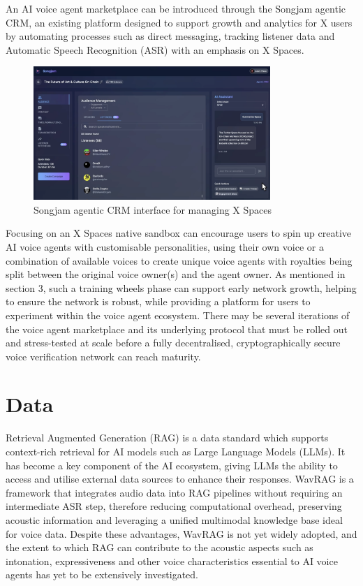 \documentclass[11pt,a4paper]{article}
\begin{document}
An AI voice agent marketplace can be introduced through the Songjam agentic CRM, an existing platform designed to support growth and analytics for X users by automating processes such as direct messaging, tracking listener data and Automatic Speech Recognition (ASR) with an emphasis on X Spaces.

\begin{figure}[H]
    \centering
    \includegraphics[width=0.8\textwidth]{crm.png}
    \caption{Songjam agentic CRM interface for managing X Spaces}
    \label{fig:crm}
\end{figure}

Focusing on an X Spaces native sandbox can encourage users to spin up creative AI voice agents with customisable personalities, using their own voice or a combination of available voices to create unique voice agents with royalties being split between the original voice owner(s) and the agent owner.
As mentioned in section 3, such a \textquotesingle training wheels\textquotesingle{} phase can support early network growth, helping to ensure the network is robust, while providing a platform for users to experiment within the voice agent ecosystem.
There may be several iterations of the voice agent marketplace and its underlying protocol that must be rolled out and stress-tested at scale before a fully decentralised, cryptographically secure voice verification network can reach maturity.

\section{Data}
\label{sec:data}
Retrieval Augmented Generation (RAG) is a data standard which supports context-rich retrieval for AI models such as Large Language Models (LLMs).
It has become a key component of the AI ecosystem, giving LLMs the ability to access and utilise external data sources to enhance their responses.
WavRAG is a framework that integrates audio data into RAG pipelines without requiring an intermediate ASR step, therefore reducing computational overhead, preserving acoustic information and leveraging a unified multimodal knowledge base ideal for voice data.
Despite these advantages, WavRAG is not yet widely adopted, and the extent to which RAG can contribute to the acoustic aspects such as intonation, expressiveness and other voice characteristics essential to AI voice agents has yet to be extensively investigated.
\end{document}
